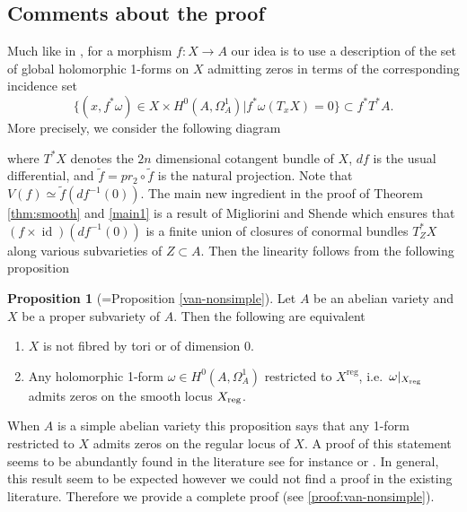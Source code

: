 \documentclass[a4paper,12pt,reqno]{amsart}
\theoremstyle{plain}
\theoremstyle{definition}
\newtheorem{proposition}[theorem]{Proposition}
\theoremstyle{remark}
\newcommand{\id}{\operatorname{id}}
\newcommand{\pr}{\operatorname{pr}}
\DeclareMathOperator{\reg}{reg}
\begin{document}
\subsection{Comments about the proof}
Much like in \cite{PS14}, for a morphism $f: X\to A$ our idea is to use a description of the set of global holomorphic 1-forms
on $X$ admitting zeros
in terms of the corresponding incidence set
\[\{(x,f^*\omega)\in X\times H^0(A,\Omega_A^1)| f^*\omega(T_xX) = 0\} \subset f^*T^*A.\] More
precisely,  we consider the following diagram 
\begin{center}
\end{center}
 where $T^*X$ denotes the $2n$ dimensional 
cotangent bundle of $X$, $df$ is the usual differential, and $\tilde{f} = pr_2\circ \tilde{f}$ is the natural projection. Note that
$V(f) \simeq \tilde{f}(df^{-1}(0))$. 
The main new ingredient in the proof of
Theorem \ref{thm:smooth} and \ref{main1} is
a result of Migliorini and Shende \cite[Theorem C]{MiSh18} which ensures that $(f\times\id)(df^{-1}(0))$
is a finite union of closures of conormal bundles
$T^*_ZX$ along various subvarieties of $Z\subset A$.
Then the linearity follows from the following proposition
\begin{proposition}[=Proposition \ref{van-nonsimple}]
Let $A$ be an abelian variety and $X$ be a proper subvariety of $A$. Then the following are equivalent
\begin{enumerate}
	\item $X$ is not fibred by tori or of dimension 0. 
	\item Any holomorphic 1-form $\omega\in H^0(A, \Omega_A^1)$ restricted to $X^{\reg}$, i.e.\ $\omega|_{X_{\textnormal{reg}}}$ admits zeros on the smooth locus $X_{\textnormal{reg}}$.
\end{enumerate}
\end{proposition}
When $A$ is a
simple abelian variety this proposition says that any 1-form restricted to $X$ admits zeros on the regular locus of $X$. A proof of this statement seems to be abundantly found in the literature
see for instance \cite[Proposition 3.1]{HK05}
or \cite[Proposition 5.12]{LMW20}. In general, this result seem to be expected however we could not find a proof in the existing literature. 
Therefore we provide a complete proof (see \ref{proof:van-nonsimple}).
\end{document}

